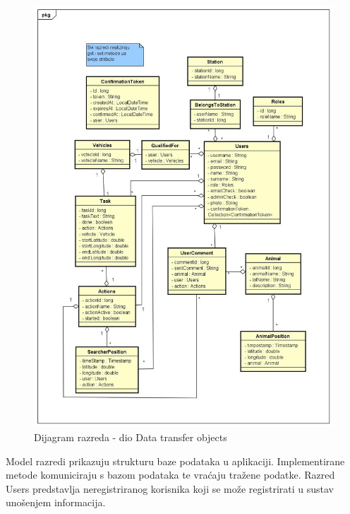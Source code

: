 			\eject

			\begin{figure}[H]
				\includegraphics[scale=0.35]{slike/klasni_dijagram_DTO.jpg}
				\centering
				\caption{Dijagram razreda - dio Data transfer objects}
				\label{fig:data_transfer_objects}
			\end{figure}

			Model razredi prikazuju strukturu baze podataka u aplikaciji. 
			Implementirane metode komuniciraju s bazom podataka te vraćaju tražene podatke. 
			Razred Users predstavlja neregistriranog korisnika koji se može registrirati u 
			sustav unošenjem informacija.


			\eject


